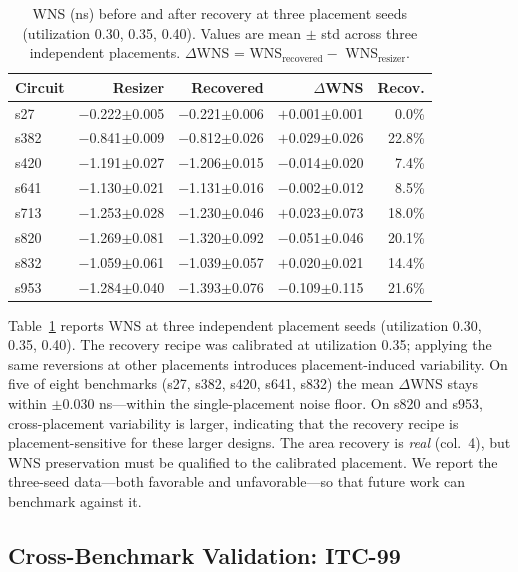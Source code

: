 \documentclass[journal]{IEEEtran}
\begin{document}
\begin{table}[t]
\centering
\caption{WNS (ns) before and after recovery at three placement seeds
(utilization 0.30, 0.35, 0.40). Values are mean $\pm$ std across
three independent placements. $\Delta$WNS = WNS$_{\text{recovered}} -$
WNS$_{\text{resizer}}$.}
\label{tab:wns}
\renewcommand{\arraystretch}{1.1}
\begin{tabular}{lrrrr}
\toprule
Circuit & Resizer & Recovered & $\Delta$WNS & Recov. \\
\midrule
s27  & $-$0.222$\pm$0.005 & $-$0.221$\pm$0.006 &
$+$0.001$\pm$0.001 &  0.0\% \\
s382 & $-$0.841$\pm$0.009 & $-$0.812$\pm$0.026 &
$+$0.029$\pm$0.026 & 22.8\% \\
s420 & $-$1.191$\pm$0.027 & $-$1.206$\pm$0.015 &
$-$0.014$\pm$0.020 &  7.4\% \\
s641 & $-$1.130$\pm$0.021 & $-$1.131$\pm$0.016 &
$-$0.002$\pm$0.012 &  8.5\% \\
s713 & $-$1.253$\pm$0.028 & $-$1.230$\pm$0.046 &
$+$0.023$\pm$0.073 & 18.0\% \\
s820 & $-$1.269$\pm$0.081 & $-$1.320$\pm$0.092 &
$-$0.051$\pm$0.046 & 20.1\% \\
s832 & $-$1.059$\pm$0.061 & $-$1.039$\pm$0.057 &
$+$0.020$\pm$0.021 & 14.4\% \\
s953 & $-$1.284$\pm$0.040 & $-$1.393$\pm$0.076 &
$-$0.109$\pm$0.115 & 21.6\% \\
\bottomrule
\end{tabular}
\end{table}

Table~\ref{tab:wns} reports WNS at three independent placement seeds
(utilization 0.30, 0.35, 0.40). The recovery recipe was calibrated at
utilization 0.35; applying the same reversions at other placements
introduces placement-induced variability. On five of eight benchmarks
(s27, s382, s420, s641, s832) the mean $\Delta$WNS stays within
$\pm$0.030 ns---within the single-placement noise floor. On s820 and
s953, cross-placement variability is larger, indicating that the
recovery recipe is placement-sensitive for these larger designs.
The area recovery is \emph{real} (col.~4), but WNS preservation must
be qualified to the calibrated placement. We report the three-seed
data---both favorable and unfavorable---so that future work can
benchmark against it.


\subsection{Cross-Benchmark Validation: ITC-99}
\end{document}
